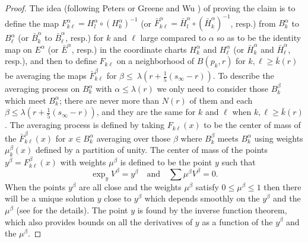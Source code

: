 \begin{proof}
The idea (following Peters \cite{Pe} or Greene and Wu \cite{Gre})
of proving the claim is to define the map $F^\alpha_{k
\ell}=H^{\alpha}_l\circ(H^{\alpha}_k)^{-1}$ (or $\bar{F}^\alpha_{k
\ell}=\bar{H}^{\alpha}_l\circ(\bar{H}^{\alpha}_k)^{-1}$, resp.)
from $B^\alpha_k$ to $B^\alpha_\ell$ (or $\bar{B}^\alpha_k$ to
$\bar{B}^\alpha_\ell$, resp.) for $k$ and $\ell$ large compared to
$\alpha$ so as to be the identity map on ${E}^\alpha$ (or
$\bar{E}^\alpha$, resp.) in the coordinate charts $H^\alpha_k$ and
$H^\alpha_\ell$ (or $\bar{H}^\alpha_k$ and $\bar{H}^\alpha_\ell$,
resp.), and then to define $F_{k \ell}$ on a neighborhood of
$B(p_k,r)$ for $k, \ell \geq \bar{k}(r)$ be averaging the maps
$\bar{F}^\beta_{k \ell}$ for $\beta \leq \
\lambda(r+\frac{1}{5}(s_{\infty}-r))$. To describe the averaging
process on $B^\alpha_k$ with $\alpha \leq \lambda(r)$ we only need
to consider those $B^\beta_k$ which meet $B^\alpha_k$; there are
never more than $N(r)$ of them and each $\beta \leq
\lambda(r+\frac{1}{5}(s_{\infty}-r))$, and they are the same for
$k$ and $\ell$ when $k, \ell \geq \bar{k}(r)$. The averaging
process is defined by taking $F_{k \ell}(x)$ to be the center of
mass of the $\bar{F}^\beta_{k \ell}(x)$ for $x \in B^\alpha_k$
averaging over those $\beta$ where $B^\beta_k$ meets $B^\alpha_k$
using weights $\mu^\beta_k(x)$ defined by a partition of unity.
The center of mass of the points $y^\beta=F^\beta_{k \ell}(x)$
with weights $\mu^\beta$ is defined to be the point $y$ such that
$$
\exp_yV^\beta = y^\beta \quad \text{and} \quad \sum \mu^\beta
V^\beta=0.
$$
When the points $y^\beta$ are all close and the weights
$\mu^\beta$ satisfy $0 \leq \mu^\beta \leq 1$ then there will be a
unique solution $y$ close to $y^\beta$ which depends smoothly on
the $y^\beta$ and the $\mu^\beta$ (see \cite{Gre} for the
details). The point $y$ is found by the inverse function theorem,
which also provides bounds on all the derivatives of $y$ as a
function of the $y^\beta$ and the $\mu^\beta$.


\end{proof}
